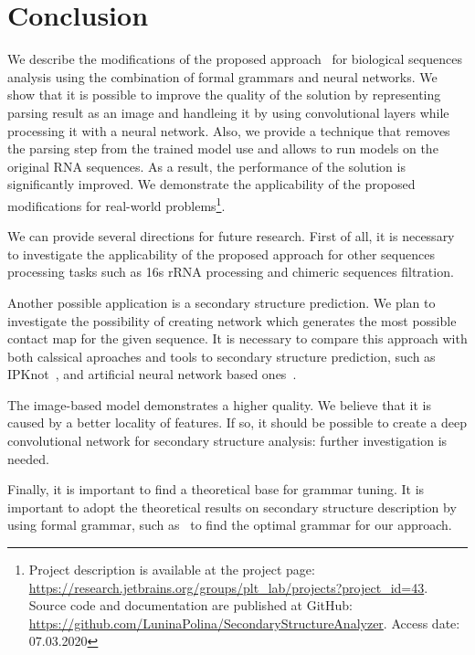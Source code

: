 \section{Conclusion}
We describe the modifications of the proposed approach~\cite{grigorevcomposition} for biological sequences analysis using the combination of formal grammars and neural networks.
We show that it is possible to improve the quality of the solution by representing parsing result as an image and handleing it by using convolutional layers while processing it with a neural network.
Also, we provide a technique that removes the parsing step from the trained model use and allows to run models on the original RNA sequences.
As a result, the performance of the solution is significantly improved.
We demonstrate the applicability of the proposed modifications for real-world problems\footnote{
Project description is available at the project page: \url{https://research.jetbrains.org/groups/plt\_lab/projects?project\_id=43}.
Source code and documentation are published at GitHub: \url{https://github.com/LuninaPolina/SecondaryStructureAnalyzer}. Access date: 07.03.2020}.

We can provide several directions for future research.
First of all, it is necessary to investigate the applicability of the proposed approach for other sequences processing tasks such as 16s rRNA processing and chimeric sequences filtration.

Another possible application is a secondary structure prediction.
We plan to investigate the possibility of creating network which generates the most possible contact map for the given sequence.
It is necessary to compare this approach with both calssical aproaches and tools to secondary structure prediction, such as IPKnot~\cite{10.1093/bioinformatics/btr215}, and artificial neural network based ones~\cite{Lu2019,Singh2019}.

The image-based model demonstrates a higher quality.
We believe that it is caused by a better locality of features.
If so, it should be possible to create a deep convolutional network for secondary structure analysis: further investigation is needed.

Finally, it is important to find a theoretical base for grammar tuning.
It is important to adopt the theoretical results on secondary structure description by using formal grammar, such as~\cite{MQbioinformatics19} to find the optimal grammar for our approach.
